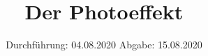 

\subject{500}
\title{Der Photoeffekt}
\date{%
  Durchführung: 04.08.2020
  \hspace{3em}
  Abgabe: 15.08.2020
}



\maketitle
\thispagestyle{empty}
\tableofcontents
\newpage






\printbibliography{}



